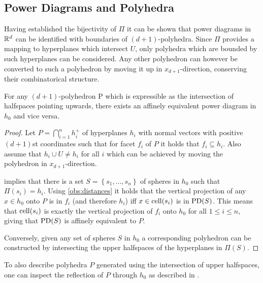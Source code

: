 \subsection{Power Diagrams and Polyhedra}
\label{sub:power_diagrams_and_polyhedra}
Having established the bijectivity of $\Pi$ it can be shown that power diagrams in $\mathbb{R}^d$ can be identified with boundaries of $(d+1)$-polyhedra.
Since $\Pi$ provides a mapping to hyperplanes which intersect $U$, only polyhedra which are bounded by such hyperplanes can be considered.
Any other polyhedron can however be converted to such a polyhedron by moving it up in $x_{d+1}$-direction, conserving their combinatorical structure.
\begin{theorem}
    \label{thm:equivalentpolyhedron}
    For any $(d+1)$-polyhedron P which is expressible as the intersection of halfspaces pointing upwards, there exists an affinely equivalent power diagram in $h_0$ and vice versa.
\end{theorem}
\begin{proof}
    Let $P = \bigcap_{i=1}^n h_i^+$ of hyperplanes $h_i$ with normal vectors with positive $(d+1)$st coordinates such that for facet $f_i$ of $P$ it holds that $f_i \subseteq h_i$.
    Also assume that $h_i \cup U \neq h_i$ for all $i$ which can be achieved by moving the polyhedron in $x_{d+1}$-direction.

     implies that there is a set $S = \left\{ s_1, \dots, s_n \right\}$ of spheres in $h_0$ such that $\Pi(s_i) = h_i$.
    Using \cref{obs:distances} it holds that the vertical projection of any $x \in h_0$ onto $P$ is in $f_i$ (and therefore $h_i$) iff $x \in \operatorname{cell}(s_i)$ is in $\operatorname{PD}(S)$.
    This means that $\operatorname{cell}(s_i)$ is exactly the vertical projection of $f_i$ onto $h_0$ for all $1 \leq i \leq n$, giving that $\operatorname{PD}(S)$ is affinely equivalent to $P$.

    Conversely, given any set of spheres $S$ in $h_0$ a corresponding polyhedron can be constructed by intersecting the upper halfspaces of the hyperplanes in $\Pi(S)$.
\end{proof}
To also describe polyhedra $P$ generated using the intersection of upper halfspaces, one can inspect the reflection of $P$ through $h_0$ as described in \cite{aurenhammer1987power}.

